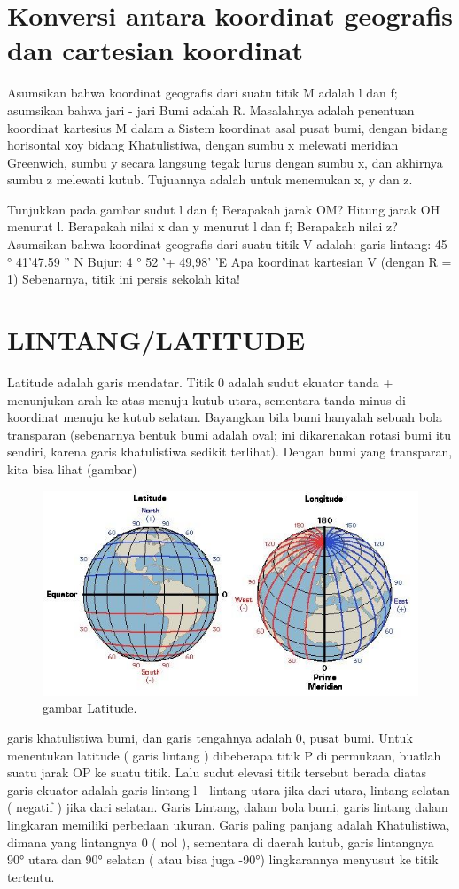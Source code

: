 \section{Konversi antara koordinat geografis dan cartesian koordinat}
	Asumsikan bahwa koordinat geografis dari suatu titik M adalah l dan f; asumsikan bahwa jari - jari
	Bumi adalah R. Masalahnya adalah penentuan koordinat kartesius M dalam a
	Sistem koordinat asal pusat bumi, dengan bidang horisontal xoy bidang
	Khatulistiwa, dengan sumbu x melewati meridian Greenwich, sumbu y secara langsung
	tegak lurus dengan sumbu x, dan akhirnya sumbu z melewati kutub.
	Tujuannya adalah untuk menemukan x, y dan z.

	Tunjukkan pada gambar sudut l dan f;
	Berapakah jarak OM?
	Hitung jarak OH menurut l.
	Berapakah nilai x dan y menurut l dan f;
	Berapakah nilai z?
	Asumsikan bahwa koordinat geografis dari suatu titik V
	adalah:
	garis lintang: 45 ° 41'47.59 '' N
	Bujur: 4 ° 52 '+ 49,98' 'E
	Apa koordinat kartesian V (dengan R = 1)
	Sebenarnya, titik ini persis sekolah kita!

\section{LINTANG/LATITUDE}

	Latitude adalah garis mendatar. Titik 0 adalah sudut ekuator tanda + menunjukan arah ke atas menuju kutub utara,
	sementara tanda minus di koordinat menuju ke kutub selatan. Bayangkan bila bumi hanyalah sebuah bola transparan 
	(sebenarnya bentuk bumi adalah oval; ini dikarenakan rotasi bumi itu sendiri, karena garis khatulistiwa sedikit 
	terlihat). Dengan bumi yang transparan, kita bisa lihat (gambar)
	\begin{figure}[ht]
	\centerline{\includegraphics[width=1\textwidth]{figures/Latitude.jpg}}
	\caption{gambar Latitude.}
	\label{Gambar Latitude}
	\end{figure}
	garis khatulistiwa bumi, dan garis tengahnya adalah
	0, pusat bumi. Untuk menentukan latitude ( garis lintang ) dibeberapa titik P di permukaan, buatlah suatu jarak OP 
	ke suatu titik. Lalu sudut elevasi titik tersebut berada diatas garis ekuator adalah garis lintang l - lintang utara
	jika dari utara, lintang selatan ( negatif ) jika dari selatan. 
	Garis Lintang, dalam bola bumi, garis lintang dalam lingkaran memiliki perbedaan ukuran. Garis paling panjang adalah 
	Khatulistiwa, dimana yang lintangnya 0 ( nol ), sementara di daerah kutub, garis lintangnya 90° utara dan 90° selatan
	( atau bisa juga -90°) lingkarannya menyusut ke titik tertentu.

